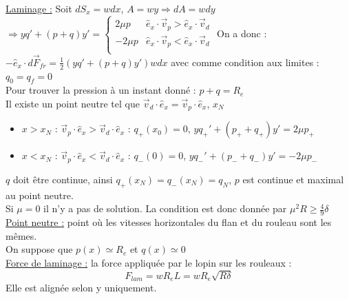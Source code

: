 \documentclass[../main.tex]{subfiles}
\begin{document}
\quad \underline{Laminage :}
Soit $dS_x = wdx$, $A = wy \Rightarrow dA = wdy$\\
$\Rightarrow y q' + (p+q)y' = \begin{cases}
    2\mu p & \hat{e}_x \cdot \Vec{v}_p > \hat{e}_x\cdot \Vec{v}_d\\
    -2 \mu p & \hat{e}_x \cdot \Vec{v}_p < \hat{e}_x\cdot \Vec{v}_d\\
\end{cases}$
On a donc : $-\hat{e}_x \cdot d\Vec{F}_{fr} = \frac{1}{2}(yq' + (p+q)y')wdx$ avec comme condition aux limites : $q_0 = q_f = 0$\\

\warning Pour trouver la pression à un instant donné : $p+q = R_e$\\

Il existe un point neutre tel que $\Vec{v}_d\cdot \hat{e}_x = \Vec{v}_p \cdot \hat{e}_x$, $x_N$\\
\begin{itemize}
    \item $x>x_N$ : $\Vec{v}_p\cdot \hat{e}_x > \Vec{v}_d \cdot \hat{e}_x$ : $q_+(x_0) = 0$, $yq_+'+(p_++q_+)y' = 2\mu p_+$\\
    \item $x<x_N$ : $\Vec{v}_p\cdot \hat{e}_x < \Vec{v}_d \cdot \hat{e}_x$ : $q_-(0) = 0$, $yq_-'+(p_-+q_-)y' = -2\mu p_-$\\
\end{itemize}

$q$ doit être continue, ainsi $q_+(x_N) = q_-(x_N) = q_N$, $p$ est continue et maximal au point neutre.\\

Si $\mu = 0$ il n'y a pas de solution. La condition est donc donnée par $\mu^2 R \geq \frac{4}{9}\delta$\\

\quad \underline{Point neutre :} point où les vitesses horizontales du flan et du rouleau sont les mêmes. \\

On suppose que $p(x) \simeq R_e$ et $q(x) \simeq 0$\\
\quad \underline{Force de laminage :} la force appliquée par le lopin sur les rouleaux : \\
\begin{equation}
    F_{lam} = w R_e L = w R_e \sqrt{R\delta}
\end{equation}
Elle est alignée selon y uniquement.\\
\end{document}

